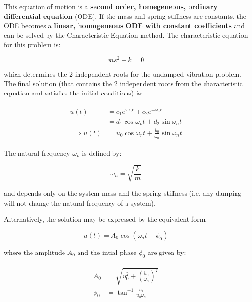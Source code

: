 \documentclass[10pt,b5paper,titlepage]{book}
\newenvironment{ematrix}
{
    \begin{eqnarray}
        \begin{aligned}
}
{
        \end{aligned}
    \end{eqnarray}
}
\begin{document}
This equation of motion is a
\textbf{second order, homegeneous, ordinary differential equation} (ODE). If the mass
and spring stiffness are constants, the ODE becomes a
\textbf{linear, homogeneous ODE with constant coefficients} and can be solved
by the Characteristic Equation method. The characteristic equation for this
problem is:

\begin{equation}
    m s^2 + k = 0
\end{equation}

which determines the 2 independent roots for the undamped vibration problem.
The final solution (that contains the 2 independent roots from the characteristic
equation and satisfies the initial conditions) is:

\begin{ematrix}
    u(t) &= c_1 e^{i \omega_n t} + c_2 e^{- \omega_n t}\\
         &= d_1 \cos{\omega_n t} + d_2 \sin{\omega_n t} \\
    \implies u(t) &= u_0 \cos{\omega_n t} + \frac{\dot{u}_0}{\omega_n} \sin{\omega_n t}
\end{ematrix}

The natural frequency $ \omega_n $ is defined by:

\begin{equation}
    \omega_n = \sqrt{\frac{k}{m}}
\end{equation}

and depends only on the system mass and the spring stiffness (i.e. any damping will
not change the natural frequency of a system).

Alternatively, the solution may be expressed by the equivalent form,

\begin{equation}
    u(t) = A_0 \cos{(\omega_n t - \phi_0)}
\end{equation}

where the amplitude $ A_0 $ and the intial phase $ \phi_0 $ are given by:

\begin{ematrix}
    A_0 &= \sqrt{u_0^2 + \left(\frac{\dot{u}_0}{\omega_n}\right)^2}\\
    \phi_0 &= \tan^{-1}\frac{\dot{u}_0}{u_0 \omega_n}
\end{ematrix}
\end{document}
